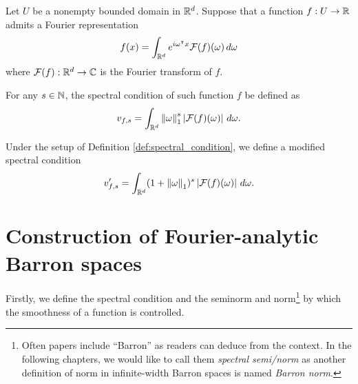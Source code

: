 

\begin{definition}
    \label{def:spectral_condition}
    Let $U$ be a nonempty bounded domain in $\mathbb{R}^d$.
    Suppose that a function $f: U \to \mathbb{R}$ admits a Fourier representation
    \begin{equation}
        f(x) = \int_{\mathbb{R}^d} e^{i\omega{}^{\intercal} x} \mathcal{F}(f)(\omega) \,d\omega
    \end{equation}
    where $\mathcal{F}(f): \mathbb{R}^d \to \mathbb{C}$ is the Fourier transform of $f$.

    For any $s \in \mathbb{N}$, the spectral condition of such function $f$ be defined
    as
    \begin{equation}
        \label{eq:spectral_condition}
        v_{f,s} 
            = \int_{\mathbb{R}^d} \left\| \omega \right\|_1^s \left| \mathcal{F}(f)(\omega) \right|\,d\omega.
    \end{equation}
\end{definition}



\begin{definition}
    \label{def:spectral_condition_mod}
    Under the setup of Definition \ref{def:spectral_condition}, we define a
    modified spectral condition
    \begin{equation}
        \label{eq:spectral_condition_mod}
        v'_{f,s} 
            = \int_{\mathbb{R}^d} (1 + \left\| \omega \right\|_1)^s \left| \mathcal{F}(f)(\omega) \right|
            \,d\omega.
    \end{equation}
\end{definition}



\section{Construction of Fourier-analytic Barron spaces}

Firstly, we define the spectral condition and the seminorm and norm\footnote{
    Often papers include ``Barron'' as readers can deduce from the context. 
    In the following chapters, we would like to call them \textit{spectral 
    semi/norm} as another definition of norm in infinite-width Barron spaces is 
    named \textit{Barron norm}.
} by which the smoothness of a function
is controlled. 

